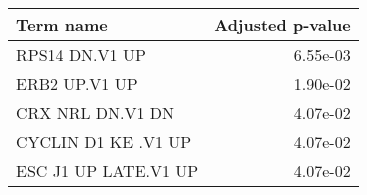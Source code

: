 \begin{tabular}{lr}
\toprule
            Term name &  Adjusted p-value \\
\midrule
       RPS14 DN.V1 UP &          6.55e-03 \\
        ERB2 UP.V1 UP &          1.90e-02 \\
     CRX NRL DN.V1 DN &          4.07e-02 \\
  CYCLIN D1 KE .V1 UP &          4.07e-02 \\
 ESC J1 UP LATE.V1 UP &          4.07e-02 \\
\bottomrule
\end{tabular}
